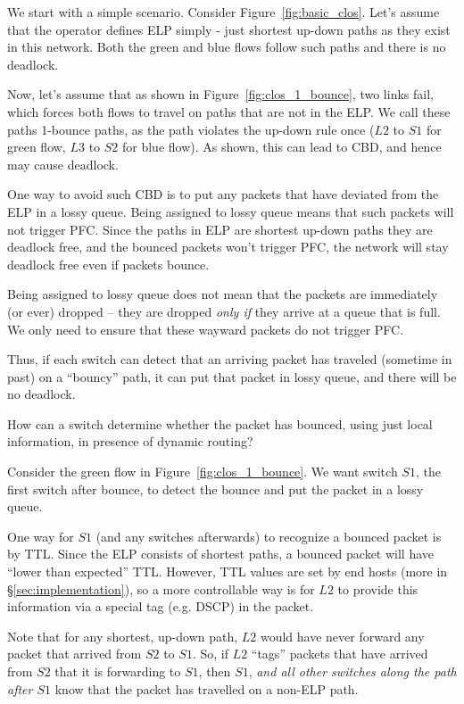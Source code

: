 We start with a simple scenario. Consider Figure~\ref{fig:basic_clos}. Let's
assume that the operator defines ELP simply - just shortest up-down paths as
they exist in this network.  Both the green and blue flows follow such paths and
there is no deadlock.

Now, let's assume that as shown in Figure~\ref{fig:clos_1_bounce}, two links
fail, which forces both flows to travel on paths that are not in the ELP. We
call these paths 1-bounce paths, as the path violates the up-down rule once
($L2$ to $S1$ for green flow, $L3$ to $S2$ for blue flow). As shown, this can
lead to CBD, and hence may cause deadlock.

One way to avoid such CBD is to put any packets that have deviated from the ELP
 in a lossy queue.  Being assigned to lossy queue means that such packets
will not trigger PFC. Since the paths in ELP are shortest up-down paths they are
deadlock free, and the bounced packets won't trigger PFC, the network will stay
deadlock free even if packets bounce.

Being assigned to lossy queue does not mean that the packets are
immediately (or ever) dropped -- they are dropped {\em only if} they arrive at a
queue that is full. We only need to ensure that these wayward packets do not trigger
PFC.

Thus, if each switch can detect that an arriving packet has traveled (sometime
in past) on a ``bouncy'' path, it can put that packet in lossy queue, and there
will be no deadlock.

How can a switch determine whether the packet has bounced, using just local
information, in presence of dynamic routing?

Consider the green flow in Figure~\ref{fig:clos_1_bounce}.  We want switch $S1$,
the first switch after bounce, to detect the bounce and put the packet in a
lossy queue.

One way for $S1$ (and any switches afterwards) to recognize a bounced packet
is by TTL. Since the ELP consists of shortest paths, a bounced packet will have
``lower than expected'' TTL. However, TTL values are set by end
hosts (more in \S\ref{sec:implementation}), so a
more controllable way is for $L2$ to provide this information via a
special tag (e.g. DSCP) in the packet.

Note that for any shortest, up-down path, $L2$ would have never
forward any packet that arrived from $S2$ to $S1$. So, if $L2$ ``tags'' packets
that have arrived from $S2$ that it is forwarding to $S1$, then $S1$, {\em and
all other switches along the path after $S1$} know that the packet has travelled
on a non-ELP path.

